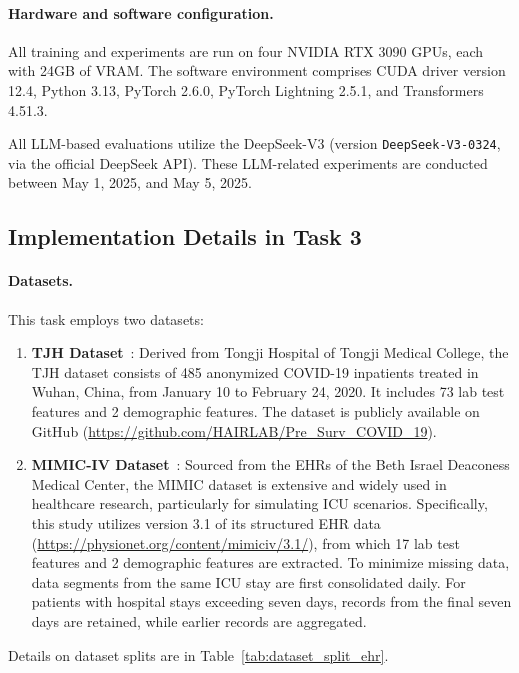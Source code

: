 \documentclass{article}
\begin{document}
\paragraph{Hardware and software configuration.}
\label{sec:app_task2_hardware_software}
All training and experiments are run on four NVIDIA RTX 3090 GPUs, each with 24GB of VRAM. The software environment comprises CUDA driver version 12.4, Python 3.13, PyTorch 2.6.0, PyTorch Lightning 2.5.1, and Transformers 4.51.3.

All LLM-based evaluations utilize the DeepSeek-V3 (version \texttt{DeepSeek-V3-0324}, via the official DeepSeek API). These LLM-related experiments are conducted between May 1, 2025, and May 5, 2025.

\subsection{Implementation Details in Task 3}
\label{sec:app_task3_details}

\paragraph{Datasets.}
\label{sec:app_task3_datasets}

This task employs two datasets:
\begin{enumerate}
    \item \textbf{TJH Dataset}~\cite{tjh}: Derived from Tongji Hospital of Tongji Medical College, the TJH dataset consists of 485 anonymized COVID-19 inpatients treated in Wuhan, China, from January 10 to February 24, 2020. It includes 73 lab test features and 2 demographic features. The dataset is publicly available on GitHub (\url{https://github.com/HAIRLAB/Pre_Surv_COVID_19}).
    \item \textbf{MIMIC-IV Dataset}~\cite{mimic4}: Sourced from the EHRs of the Beth Israel Deaconess Medical Center, the MIMIC dataset is extensive and widely used in healthcare research, particularly for simulating ICU scenarios. Specifically, this study utilizes version 3.1 of its structured EHR data~\cite{mimiciv_v3_1} (\url{https://physionet.org/content/mimiciv/3.1/}), from which 17 lab test features and 2 demographic features are extracted. To minimize missing data, data segments from the same ICU stay are first consolidated daily. For patients with hospital stays exceeding seven days, records from the final seven days are retained, while earlier records are aggregated.
\end{enumerate}
Details on dataset splits are in Table~\ref{tab:dataset_split_ehr}.
\end{document}
